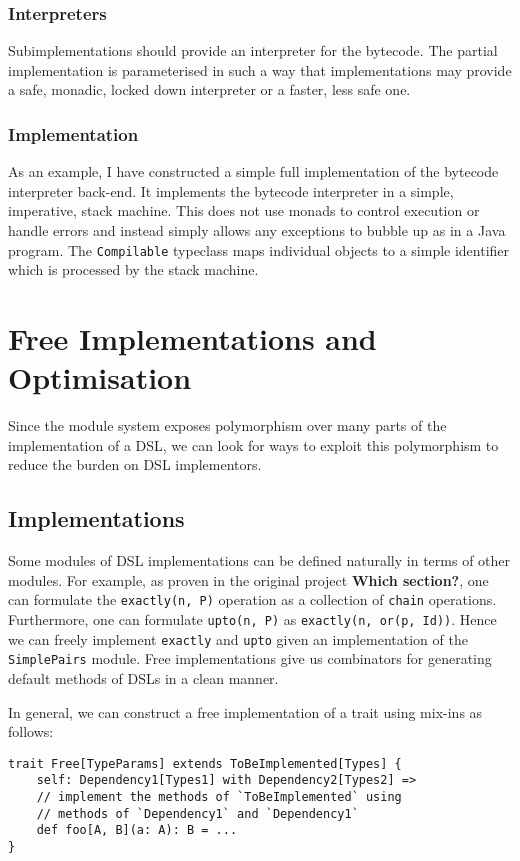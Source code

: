 \documentclass{report}
\newcommand \2[0]{\textbf{2}}
\newcommand \3[0]{\textbf{3}}
\newcommand{\todo}[1]{\textbf{#1}}
\begin{document}
\subsection{Interpreters}
Subimplementations should provide an interpreter for the bytecode. The partial implementation is parameterised in such a way that implementations may provide a safe, monadic, locked down interpreter or a faster, less safe one.

\subsection{Implementation}
As an example, I have constructed a simple full implementation of the bytecode interpreter back-end. It implements the bytecode interpreter in a simple, imperative, stack machine. This does not use monads to control execution or handle errors and instead simply allows any exceptions to bubble up as in a Java program. The \texttt{Compilable} typeclass maps individual objects to a simple identifier which is processed by the stack machine.

\chapter{Free Implementations and Optimisation}
Since the module system exposes polymorphism over many parts of the implementation of a DSL, we can look for ways to exploit this polymorphism to reduce the burden on DSL implementors.

\section{Implementations}
Some modules of DSL implementations can be defined naturally in terms of other modules. For example, as proven in the original project \todo{Which section?}, one can formulate the \texttt{exactly(n, P)} operation as a collection of \texttt{chain} operations. Furthermore, one can formulate \texttt{upto(n, P)} as \texttt{exactly(n, or(p, Id))}. Hence we can freely implement \texttt{exactly} and \texttt{upto} given an implementation of the \texttt{SimplePairs} module. Free implementations give us combinators for generating default methods of DSLs in a clean manner.

In general, we can construct a free implementation of a trait using mix-ins as follows:

\begin{verbatim}
trait Free[TypeParams] extends ToBeImplemented[Types] {
    self: Dependency1[Types1] with Dependency2[Types2] =>
    // implement the methods of `ToBeImplemented` using 
    // methods of `Dependency1` and `Dependency1`
    def foo[A, B](a: A): B = ...
}
\end{verbatim}
\end{document}
